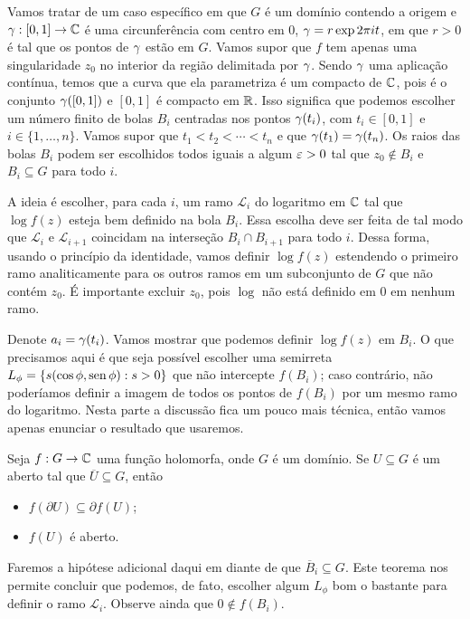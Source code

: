     Vamos tratar de um caso específico em que $G$ é um domínio contendo a origem e 
    $\gamma: [0,1] \to \mathbb{C}$ é uma circunferência com centro em $0$, $\gamma = r\exp{2 \pi i t}$, 
    em que $r > 0$ é tal que os pontos de $\gamma$ estão em $G$. Vamos supor que $f$ tem apenas 
    uma singularidade $z_0$ no interior da região delimitada por $\gamma$. Sendo $\gamma$ uma
    aplicação contínua, temos que a curva que ela parametriza é um compacto de $\mathbb{C}$, pois é o
    conjunto $\gamma([0,1])$ e $[0,1]$ é compacto em $\mathbb{R}$. Isso significa que podemos escolher um
    número finito de bolas $B_i$ centradas nos pontos $\gamma(t_i)$, com $t_i \in [0,1]$ e 
    $i \in \{1,\dots, n\}$. Vamos supor que $t_1 < t_2 < \cdots < t_n$ e que 
    $\gamma(t_1) = \gamma(t_n)$.  Os raios das bolas $B_i$ podem ser escolhidos todos iguais a
    algum $\varepsilon > 0$ tal que $z_0 \not \in B_i$ e $B_i \subseteq G$ para todo $i$.
    
    A ideia é escolher, para cada $i$, um ramo $\mathcal{L}_i$ do logaritmo em $\mathbb{C}$ tal que 
    $\log f(z)$ esteja bem definido na bola $B_i$. Essa escolha deve ser feita de tal modo que
    $\mathcal{L}_i$ e $\mathcal{L}_{i+1}$ coincidam na interseção $B_i \cap B_{i+1}$ para todo $i$.
    Dessa forma, usando o princípio da identidade, vamos definir $\log f(z)$ estendendo o primeiro
    ramo analiticamente para os outros ramos em um subconjunto de $G$ que não contém $z_0$. 
    É importante excluir $z_0$, pois $\log$ não está definido em $0$ em nenhum ramo.
    
    Denote $a_i = \gamma(t_i)$. Vamos mostrar que podemos definir $\log f(z)$ em $B_i$. 
    O que precisamos aqui é que seja possível escolher uma semirreta 
    $L_\phi = \{s(\cos \phi, \operatorname{sen} \phi): s > 0\}$ que não intercepte $f(B_i)$; caso contrário, 
    não poderíamos definir a imagem de todos os pontos de $f(B_i)$ por um mesmo ramo do logaritmo.
    Nesta parte a discussão fica um pouco mais técnica, então vamos apenas enunciar o resultado 
    que usaremos. 
    \begin{teorema}
        Seja $f: G \to \mathbb{C}$ uma função holomorfa, onde $G$ é um domínio. 
        Se $U \subseteq G$ é um aberto tal que $\overline{U} \subseteq G$, então
        \begin{itemize}
            \item $f(\partial U) \subseteq \partial f(U)$;
            \item $f(U)$ é aberto.
        \end{itemize}
    \end{teorema}
    Faremos a hipótese adicional daqui em diante de que $\overline{B}_i \subseteq G$. 
    Este teorema nos permite concluir que podemos, de fato, escolher algum $L_\phi$ 
    bom o bastante para definir o ramo $\mathcal{L}_i$. Observe ainda que $0 \not \in f(B_i)$.
    
